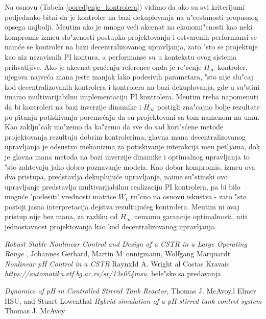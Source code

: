 \documentclass[a4paper,11pt]{article}
\theoremstyle{definition} \newtheorem{deff}{Definicija}[section]
\theoremstyle{definition} \newtheorem{prim}[deff]{Primer}
\theoremstyle{plain} \newtheorem{teor}[deff]{Teorema}
\begin{document}
			
			Na osnovu (Tabela \ref{poredjenje_kontrolera}) vidimo da ako su svi kriterijumi podjednako bitni da je kontroler na bazi dekuplovanja na u"cestanosti propusnog opsega najbolji. Me\dj{}utim ako je mnogo ve\'ci akcenat na ekonomi"cnosti kao neki kompromis izme\dj{}u slo"zenosti postupka projektovanja i ostvarenih performansi se nam\'ce se kontroler na bazi decentralizovanog upravljanja, zato "sto se projektuje kao niz nezavisnih PI kontura, a performanse su u kontekstu ovog sistema prihvatljive. Ako je akcenat pra\'cenju reference onda je re"senje $H_{\infty}$ kontroler, njegova najve\'ca mana jeste manjak lako podesivih parametara, "sto nije slu"caj kod decentralizovanih kontrolera i kontrolera na bazi dekuplovanja, gde u su"stini imamo multivarijabilnu implementaciju PI kontrolera. Me\dj{}utim treba napomenuti da bi kontroleri na bazi inverzije dinamike i $H_{\infty}$ postigli zna"cajno bolje rezultate po pitanju potiskivanja poreme\'caja da su projektovani sa tom namenom na umu.\\
			
			Kao zaklju"cak mo"zemo da ka"zemo da sve do sad kori"s\'cene metode projektovanja rezultuju dobrim kontrolerima, glavna mana decentralizovanog upravljanja je odsustvo mehanizma za potiskivanje interakcija me\dj{}u petljama, dok je glavna mana metoda na bazi inverzije dinamike i optimalnog upravljanja to "sto zahtevaju jako dobro poznavanje modela. Kao dobar kompromis, izme\dj{}u ova dva pristupa, predstavlja dekupluju\'ce upravljanje, naime su"stinski ovo upravljanje predstavlja multivarijabilnu realizaciju PI kontrolera, pa bi bilo mogu\'ce 'podesiti' vrednosti matrice $W_1$ ru"cno na osnovu iskustva - zato "sto postoji jasna interpretacija dejstva rezultuju\'ceg kontrolera. Me\dj{}utim ni ovaj pristup nije bez mana, za razliku od $H_{\infty}$ nemamo garancije optimalnosti, niti jednostavnost projektovanja kao kod decentralizovanog upravljanja.
			
			
			\newpage
			
			\begin{thebibliography}{9}
				\emph{Robust Stable Nonlinear Control
					and Design of a CSTR in a Large
					Operating Range
				}, Johannes Gerhard, Martin M¨onnigmann,
				Wolfgang Marquardt
				\bibitem{}\emph{Nonlinear pH Control in a CSTR
				} RaynxId A. Wright al Costas Kravais
				\emph{https://automatika.etf.bg.ac.rs/sr/13e054msu}, bele"ske sa predavanja
				
				
				
				\emph{Dynamics of pH in Controlled Stirred Tank Reactor}, Thomas J. McAvoy,l Elmer HSU, and Stuart Lowenthal
				\bibitem{}\emph{Hybrid simulation of a pH stirred
					tank control system} Thomas J. McAvoy
				
				
			\end{thebibliography}
		
\end{document}
